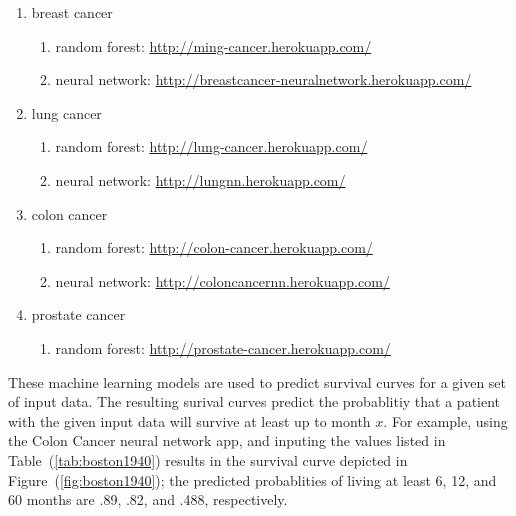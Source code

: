 \documentclass[a4paper,11pt]{article}
\begin{document}
\begin{enumerate}[noitemsep]
\item breast cancer 
    \begin{enumerate}[noitemsep]
    \item random forest: \url{http://ming-cancer.herokuapp.com/}
    \item neural network: \url{http://breastcancer-neuralnetwork.herokuapp.com/}
    \end{enumerate}
\item lung cancer
   \begin{enumerate}[noitemsep]
   \item random forest: \url{http://lung-cancer.herokuapp.com/}
   \item neural network: \url{http://lungnn.herokuapp.com/}
    \end{enumerate}
\item colon cancer
  \begin{enumerate}[noitemsep]
   \item random forest: \url{http://colon-cancer.herokuapp.com/}
   \item neural network: \url{http://coloncancernn.herokuapp.com/}
   \end{enumerate}
\item prostate cancer
  \begin{enumerate}[noitemsep]
   \item random forest: \url{http://prostate-cancer.herokuapp.com/}
   \end{enumerate}
\end{enumerate}


These machine learning models are used to predict survival curves for a given set of input data. 
The resulting surival curves predict the probablitiy that a patient with the given input data will survive at least up to month $x$. For example, using the Colon Cancer neural network app, and 
inputing the values listed in Table~(\ref{tab:boston1940}) results in the survival curve depicted in Figure~(\ref{fig:boston1940}); the predicted probablities of living 
at least 6, 12, and 60 months are .89, .82, and .488, respectively.
\end{document}
